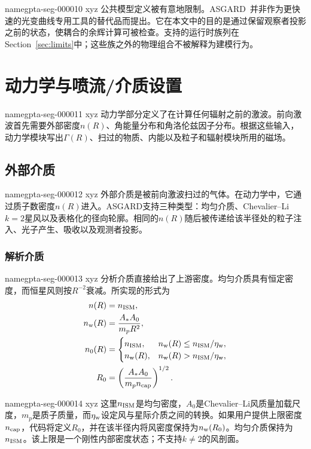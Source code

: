 \documentclass[twocolumn]{aastex702}
\makeatletter
\newcommand{\asgard}{\textsc{ASGARD}}
\providecommand{\gptareaderanchor}[1]{\pdfdest name{#1} xyz}%
\providecommand{\gptareaderanchor}[1]{\special{pdf:dest (#1) [ @thispage /XYZ @xpos @ypos null ]}}%
\makeatother
\begin{document}
\gptareaderanchor{gpta-seg-000010}%
公共模型定义被有意地限制。\asgard\ 并非作为更快速的光变曲线专用工具的替代品而提出。它在本文中的目的是通过保留观察者投影之前的状态，使耦合的余辉计算可被检查。支持的运行时族列在Section~\ref{sec:limits}中；这些族之外的物理组合不被解释为建模行为。

\section{动力学与喷流/介质设置} \label{sec:dynamics}


\gptareaderanchor{gpta-seg-000011}%
动力学部分定义了在计算任何辐射之前的激波。前向激波首先需要外部密度\(n(R)\)、角能量分布和角洛伦兹因子分布。根据这些输入，动力学模块写出\(\Gamma(R)\)、扫过的物质、内能以及粒子和辐射模块所用的磁场。

\subsection{外部介质}


\gptareaderanchor{gpta-seg-000012}%
外部介质是被前向激波扫过的气体。在动力学中，它通过质子数密度\(n(R)\)进入。\asgard{}支持三种类型：均匀介质、Chevalier–Li \(k=2\)星风以及表格化的径向轮廓。相同的\(n(R)\)随后被传递给该半径处的粒子注入、光子产生、吸收以及观测者投影。

\subsubsection{解析介质}


\gptareaderanchor{gpta-seg-000013}%
分析介质直接给出了上游密度。均匀介质具有恒定密度，而恒星风则按\(R^{-2}\)衰减。所实现的形式为
\begin{equation}
\begin{aligned}
n(R) &= n_{\rm ISM},\\
n_{\rm w}(R) &= \frac{A_\ast A_0}{m_pR^2},\\
n_0(R) &=
\begin{cases}
n_{\rm ISM}, & n_{\rm w}(R)\le n_{\rm ISM}/\eta_{\rm w},\\
n_{\rm w}(R), & n_{\rm w}(R)> n_{\rm ISM}/\eta_{\rm w},
\end{cases}\\
R_0 &= \left(\frac{A_\ast A_0}{m_p n_{\rm cap}}\right)^{1/2}.
\end{aligned}
\end{equation}

\gptareaderanchor{gpta-seg-000014}%
这里\(n_{\rm ISM}\)是均匀密度，\(A_0\)是Chevalier--Li风质量加载尺度，\(m_p\)是质子质量，而\(\eta_{\rm w}\)设定风与星际介质之间的转换\citep{ChevalierLi2000}。如果用户提供上限密度\(n_{\rm cap}\)，代码将定义\(R_0\)，并在该半径内将风密度保持为\(n_{\rm w}(R_0)\)。均匀介质保持为\(n_{\rm ISM}\)。该上限是一个刚性内部密度状态；不支持\(k\ne2\)的风剖面。
\end{document}

